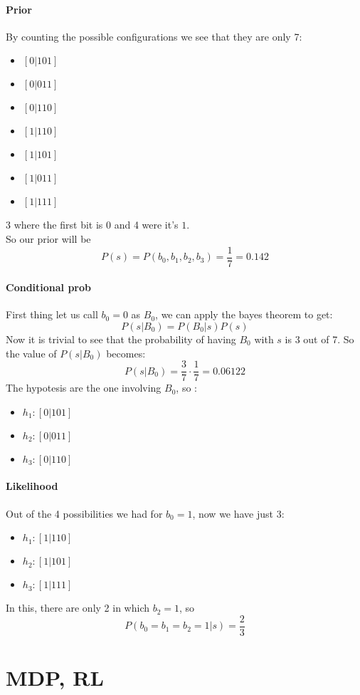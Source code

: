 \paragraph{Prior}
By counting the possible configurations we see that they are only 7:
\begin{itemize}
\item $[0|101]$
\item $[0|011]$
\item $[0|110]$
\item $[1|110]$
\item $[1|101]$
\item $[1|011]$
\item $[1|111]$
\end{itemize}
3 where the first bit is $0$ and 4 were it's $1$.\\
So our prior will be 
$$P(s)=P(b_0,b_1,b_2,b_3)=\frac{1}{7}=0.142$$

\paragraph{Conditional prob}
First thing let us call $b_0=0$ as $B_0$, we can apply the bayes theorem to get: 
$$P(s|B_0)=P(B_0|s)P(s)$$
Now it is trivial to see that the probability of having $B_0$ with $s$ is 3 out of 7. So the value of  $P(s|B_0)$ becomes:
$$P(s|B_0)=\frac{3}{7}\cdot \frac{1}{7}=0.06122$$
The hypotesis are the one involving $B_0$, so :
\begin{itemize}
\item $h_1:[0|101]$
\item $h_2:[0|011]$
\item $h_3:[0|110]$
\end{itemize}

\paragraph{Likelihood}
Out of the 4 possibilities we had for $b_0=1$, now we have just 3:
\begin{itemize}
\item $h_1:[1|110]$
\item $h_2:[1|101]$
\item $h_3:[1|111]$
\end{itemize}
In this, there are only 2 in which $b_2=1$, so 
$$P(b_0=b_1=b_2=1|s)=\frac{2}{3}$$


\section{MDP, RL}
